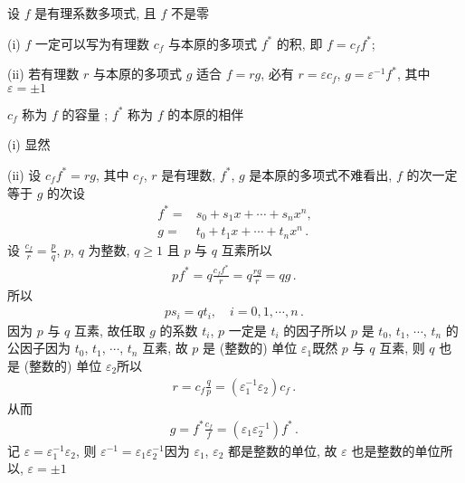 \begin{proposition}
    设 $f$ 是有理系数多项式, 且 $f$ 不是零\period

    (i) $f$ 一定可以写为有理数 $c_f$ 与本原的多项式 $f^{\ast}$ 的积, 即 $f = c_f f^{\ast}$;

    (ii) 若有理数 $r$ 与本原的多项式 $g$ 适合 $f = rg$, 必有 $r = \varepsilon c_f$, $g = \varepsilon^{-1} f^{\ast}$, 其中 $\varepsilon = \pm 1$\period

    $c_f$ 称为 $f$ 的容量 ; $f^{\ast}$ 称为 $f$ 的本原的相伴 \period
\end{proposition}

\begin{pf}
    (i) 显然\period

    (ii) 设 $c_f f^{\ast} = r g$, 其中 $c_f$, $r$ 是有理数, $f^{\ast}$, $g$ 是本原的多项式\period 不难看出, $f$ 的次一定等于 $g$ 的次\period 设
    \begin{align*}
        f^{\ast} = {} & s_0 + s_1 x + \cdots + s_n x^n,        \\
        g = {}        & t_0 + t_1 x + \cdots + t_n x^n \period
    \end{align*}
    设 $\frac{c_f}{r} = \frac{p}{q}$, $p$, $q$ 为整数, $q \geq 1$ 且 $p$ 与 $q$ 互素\period 所以
    \begin{align*}
        p f^{\ast} = q \frac{c_f f^{\ast}}{r} = q \frac{r g}{r} = q g \period
    \end{align*}
    所以
    \begin{align*}
        p s_i = q t_i, \quad i = 0,1,\cdots,n \period
    \end{align*}
    因为 $p$ 与 $q$ 互素, 故任取 $g$ 的系数 $t_i$, $p$ 一定是 $t_i$ 的因子\period 所以 $p$ 是 $t_0$, $t_1$, $\cdots$, $t_n$ 的公因子\period 因为 $t_0$, $t_1$, $\cdots$, $t_n$ 互素, 故 $p$ 是 (整数的) 单位 $\varepsilon_1$\period 既然 $p$ 与 $q$ 互素, 则 $q$ 也是 (整数的) 单位 $\varepsilon_2$\period 所以
    \begin{align*}
        r = c_f \frac{q}{p} = (\varepsilon_1^{-1} \varepsilon_2) c_f \period
    \end{align*}
    从而
    \begin{align*}
        g = f^{\ast} \frac{c_f}{f} = (\varepsilon_1 \varepsilon_2^{-1}) f^{\ast} \period
    \end{align*}
    记 $\varepsilon = \varepsilon_1^{-1} \varepsilon_2$, 则 $\varepsilon^{-1} = \varepsilon_1 \varepsilon_2^{-1}$\period 因为 $\varepsilon_1$, $\varepsilon_2$ 都是整数的单位, 故 $\varepsilon$ 也是整数的单位\period 所以, $\varepsilon = \pm 1$\period
\end{pf}

